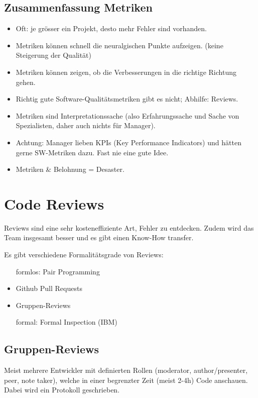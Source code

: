 \subsection{Zusammenfassung Metriken}

\begin{itemize}
	\item Oft: je grösser ein Projekt, desto mehr Fehler sind vorhanden.
	\item Metriken können schnell die neuralgischen Punkte aufzeigen. (keine Steigerung der Qualität)
	\item Metriken können zeigen, ob die Verbesserungen in die richtige Richtung gehen.
	\item Richtig gute Software-Qualitätsmetriken gibt es nicht; Abhilfe: Reviews.
	\item Metriken sind Interpretationssache (also Erfahrungssache und Sache von Spezialisten, daher auch nichts für Manager).
	\item Achtung: Manager lieben KPIs (Key Performance Indicators) und hätten gerne SW-Metriken dazu. Fast nie eine gute Idee.
	\item Metriken \& Belohnung = Desaster.
\end{itemize}


\section{Code Reviews}

Reviews sind eine sehr kosteneffiziente Art, Fehler zu entdecken. Zudem wird das Team insgesamt  besser und es gibt einen Know-How transfer.

Es gibt verschiedene Formalitätsgrade von Reviews:
\begin{itemize}
	\item[formlos:] Pair Programming
	\item Github Pull Requests
	\item Gruppen-Reviews
	\item[formal:] Formal Inspection (IBM)
\end{itemize}

\subsection{Gruppen-Reviews}

Meist mehrere Entwickler mit definierten Rollen (moderator, author/presenter, peer, note taker), welche in einer begrenzter Zeit (meist 2-4h) Code anschauen. Dabei wird ein Protokoll geschrieben.

